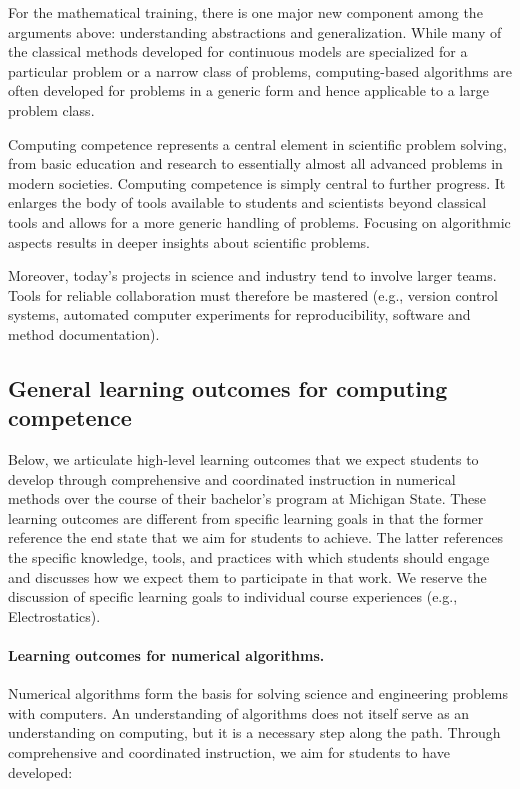 \documentclass[%
oneside,                 %
final,                   %
10pt]{article}
\begin{document}
For the mathematical training, there is one major new component among the arguments above: understanding abstractions and generalization. While many of the classical methods developed for continuous models are specialized for a particular problem or a narrow class of problems, computing-based algorithms are often developed for problems in a generic form and hence applicable to a large problem class.


Computing competence represents a central element in scientific problem solving, from basic education and research to essentially almost all advanced problems in modern societies. Computing competence is simply central to further progress. It enlarges the body of tools available to students and scientists beyond classical tools and allows for a more generic handling of problems. Focusing on algorithmic aspects results in deeper insights about scientific problems.

Moreover, today's projects in science and industry tend to involve larger teams. Tools for reliable collaboration must therefore be mastered (e.g., version control systems, automated computer experiments for reproducibility, software and method documentation).


\subsection*{General learning outcomes for computing competence}

Below, we articulate high-level learning outcomes that we expect students to develop through comprehensive and coordinated instruction in numerical methods over the course of their bachelor's program at Michigan State. These learning outcomes are different from specific learning goals in that the former reference the end state that we aim for students to achieve. The latter references the specific knowledge, tools, and practices with which students should engage and discusses how we expect them to participate in that work. We reserve the discussion of specific learning goals to individual course experiences (e.g., Electrostatics).

\paragraph{Learning outcomes for numerical algorithms.}
Numerical algorithms form the basis for solving science and engineering problems with computers. An understanding of algorithms does not itself serve as an understanding on computing, but it is a necessary step along the path. Through comprehensive and coordinated instruction, we aim for students to have developed:
\end{document}
